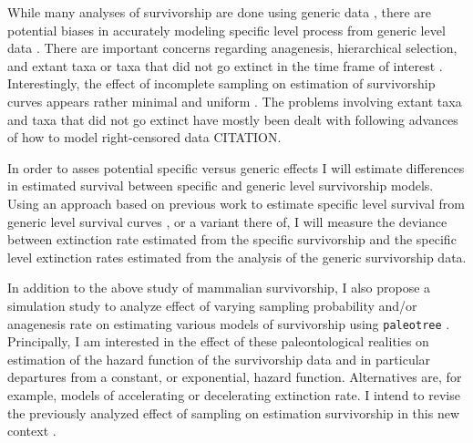 \documentclass[12pt,letterpaper]{article}
\begin{document}


While many analyses of survivorship are done using generic data \citep{Tomiya2013,Liow2008,Harnik2013}, there are potential biases in accurately modeling specific level process from generic level data \citep{Raup1975,Sepkoski1975,Simpson2006,Raup1991a,VanValen1979}. There are important concerns regarding anagenesis, hierarchical selection, and extant taxa or taxa that did not go extinct in the time frame of interest \citep{Raup1975,VanValen1979,Simpson2006,Raup1991a}. Interestingly, the effect of incomplete sampling on estimation of survivorship curves appears rather minimal and uniform \citep{Sepkoski1975}. The problems involving extant taxa and taxa that did not go extinct have mostly been dealt with following advances of how to model right-censored data CITATION. 

In order to asses potential specific versus generic effects I will estimate differences in estimated survival between specific and generic level survivorship models. Using an approach based on previous work to estimate specific level survival from generic level survival curves \citep{Foote1988}, or a variant there of, I will measure the deviance between extinction rate estimated from the specific survivorship and the specific level extinction rates estimated from the analysis of the generic survivorship data. 

In addition to the above study of mammalian survivorship, I also propose a simulation study to analyze effect of varying sampling probability and/or anagenesis rate on estimating various models of survivorship using \texttt{paleotree} \citep{Bapst2012a}. Principally, I am interested in the effect of these paleontological realities on estimation of the hazard function of the survivorship data and in particular departures from a constant, or exponential, hazard function. Alternatives are, for example, models of accelerating or decelerating extinction rate. I intend to revise the previously analyzed effect of sampling on estimation survivorship in this new context \citep{Sepkoski1975}.
\end{document}
